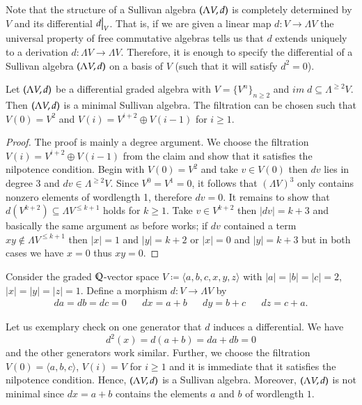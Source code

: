 Note that the structure of a Sullivan algebra $(\Lambda V,d)$ is completely determined by  $V$ and its
differential $\restr{d}{V}$. That is, if we are given a linear map $d \colon V \to \Lambda V$ the
universal property of free commutative algebras tells us that $d$ extends uniquely to a derivation $d \colon \Lambda V \to \Lambda V$.
Therefore, it is enough to specify the differential of a Sullivan algebra $(\Lambda V,d)$ on a basis of $V$ (such that
it will satisfy $d^2 = 0$).


\begin{Proposition}
\label{prop:WellBehavedFiltrations}
 Let $(\Lambda V,d)$ be a differential graded algebra with $V = {\lbrace V^n \rbrace}_{n \geq 2}$ and 
 $im \;d \subseteq \Lambda^{\geq 2} V$. Then $(\Lambda V,d)$ is a minimal Sullivan algebra.
 The filtration can be chosen such that $V(0) = V^2$ and
 $V(i) = V^{i+2} \oplus V(i-1)$ for $i \geq 1$.
\end{Proposition}
\begin{proof}
 The proof is mainly a degree argument. We choose the filtration $V(i) = V^{i+2} \oplus V(i-1)$ from the claim
 and show that it satisfies
 the nilpotence condition. Begin with $V(0) = V^2$ and take $v \in V(0)$ then $dv$ lies in
	degree $3$ and $dv \in \Lambda^{\geq 2} V$. Since $V^0 = V^1 = 0$, it follows that ${(\Lambda V)}^3$ only contains 
 nonzero elements of wordlength 1, therefore $dv = 0$. 
 It remains to show that  $d(V^{k+2}) \subseteq \Lambda V^{ \leq k+1}$ holds for $k \geq 1$. Take $v \in V^{ k+2}$ then 
 $| dv | = k + 3$ and basically the same argument as before works; if $dv$ contained a term $xy \notin \Lambda V^{\leq k+1}$
 then $|x| = 1$ and $|y| = k + 2$ or $|x| = 0$ and $|y| = k + 3$ but in both cases we have $x = 0$ thus $xy = 0$.
\end{proof}

\begin{Example}
\label{ex:AlgebraConstructedFromK3}
 Consider the graded $\mathbb{Q}$-vector space $V \coloneqq \langle a,b,c, x,y,z \rangle$ with $|a| = |b| = |c| = 2$,
 $|x| = |y| = |z| = 1$. Define a morphism $d \colon V \to \Lambda V$ by 
 \begin{align*}
 da = db = dc = 0 & &
 dx = a + b & & dy = b + c & & dz = c + a.  
 \end{align*}

 
 Let us exemplary check on one generator 
 that $d$ induces a differential. We have 
 $$d^2(x) = d(a + b) = da + db = 0$$ and the other generators work similar.
 Further, we choose the filtration $V(0) = \langle a,b,c \rangle$, $V(i) = V$ for $i \geq 1$ and it is 
 immediate that it satisfies the nilpotence condition. Hence, $(\Lambda V,d)$ is a Sullivan algebra. Moreover,
 $(\Lambda V,d)$ is not minimal since $dx = a + b$ contains the elements $a$ and $b$ of wordlength $1$.
\end{Example}


